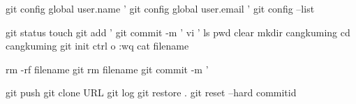 git config global user.name '%
git config global user.email '%
git config --list %

git status
touch %
git add '%
git commit -m '%
vi '%
ls %
pwd %
clear
mkdir cangkuming  %
cd cangkuming %
git init %
ctrl o %
:wq   %
cat filename %

rm -rf filename
git rm filename
git commit -m '%

git push %
git clone URL
git log %
git restore . %
git reset --hard commitid %